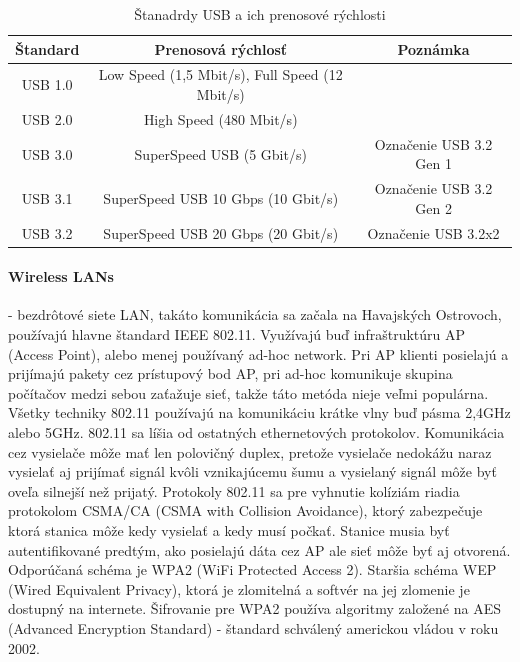 \documentclass[../../main.tex]{subfiles}
\begin{document}
\begin{table}[h!]
\begin{tabular}{|c|c|c|}
\hline
\textbf{Štandard} &
\textbf{Prenosová rýchlosť}&
\textbf{Poznámka}\\
\hline
USB 1.0
&
Low Speed (1,5 Mbit/s), Full Speed (12 Mbit/s)
& \\
\hline
USB 2.0
&
High Speed (480 Mbit/s)
& \\
\hline
USB 3.0
&
SuperSpeed USB (5 Gbit/s)
&
Označenie USB 3.2 Gen 1
\\
\hline
USB 3.1
&
SuperSpeed USB 10 Gbps (10 Gbit/s)
&
Označenie USB 3.2 Gen 2
\\
\hline
USB 3.2
&
SuperSpeed USB 20 Gbps (20 Gbit/s)
&
Označenie USB 3.2x2 
\\
\hline

\end{tabular}
\caption{Štanadrdy USB a ich prenosové rýchlosti\cite{USB_ALZA}}
\label{table:USB_ALZA}
\end{table}

\paragraph{Wireless LANs} - bezdrôtové siete LAN, takáto komunikácia sa začala na Havajských Ostrovoch, používajú hlavne štandard IEEE 802.11. Využívajú buď infraštruktúru AP (Access Point), alebo menej používaný ad-hoc network. Pri AP klienti posielajú a prijímajú pakety cez prístupový bod AP, pri ad-hoc komunikuje skupina počítačov medzi sebou zaťažuje sieť, takže táto metóda nieje veľmi populárna. Všetky techniky 802.11 používajú na komunikáciu krátke vlny buď pásma 2,4GHz alebo 5GHz.
802.11 sa líšia od ostatných ethernetových protokolov. Komunikácia cez vysielače môže mať len polovičný duplex, pretože vysielače nedokážu naraz vysielať aj prijímať signál kvôli vznikajúcemu šumu a vysielaný signál môže byť oveľa silnejší než prijatý. Protokoly 802.11 sa pre vyhnutie kolíziám riadia protokolom CSMA/CA
(CSMA with Collision Avoidance), ktorý zabezpečuje ktorá stanica môže kedy vysielať a kedy musí počkať. Stanice musia byť autentifikované predtým, ako posielajú dáta cez AP ale sieť môže byť aj otvorená. Odporúčaná schéma je WPA2 (WiFi Protected Access 2). Staršia schéma WEP (Wired Equivalent
Privacy), ktorá je zlomitelná a softvér na jej zlomenie je dostupný na internete. Šifrovanie pre WPA2 používa algoritmy založené na AES (Advanced Encryption Standard) - štandard schválený americkou vládou v roku 2002.\cite{tanenbaum}
\end{document}
